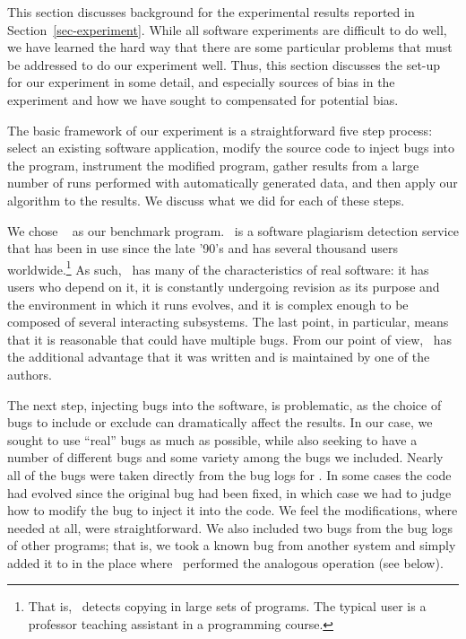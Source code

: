 This section discusses background for the experimental results
reported in Section~\ref{sec-experiment}.  While all software
experiments are difficult to do well, we have learned the hard way
that there are some particular problems that must be addressed to do
our experiment well.  Thus, this section discusses the set-up for our
experiment in some detail, and especially sources of bias in the
experiment and how we have sought to compensated for potential bias.

The basic framework of our experiment is a straightforward five step
process: select an existing software application, modify the source
code to inject bugs into the program, instrument the modified program,
gather results from a large number of runs performed with
automatically generated data, and then apply our algorithm to the
results.  We discuss what we did for each of these steps.

We chose \moss\ \cite{SWA03} as our benchmark program.  \moss\ is a
software plagiarism detection service that has been in use since the
late '90's and has several thousand users worldwide.\footnote{That is,
\moss\ detects copying in large sets of programs.  The typical \moss
user is a professor teaching assistant in a programming course.}  As
such, \moss\ has many of the characteristics of real software: it has
users who depend on it, it is constantly undergoing revision as its
purpose and the environment in which it runs evolves, and it is
complex enough to be composed of several interacting subsystems.  The
last point, in particular, means that it is reasonable that \moss
could have multiple bugs.  From our point of view, \moss\ has the
additional advantage that it was written and is maintained by one of
the authors.

The next step, injecting bugs into the software, is problematic, as
the choice of bugs to include or exclude can dramatically affect the
results.  In our case, we sought to use ``real'' bugs as much as
possible, while also seeking to have a number of different bugs and
some variety among the bugs we included.  Nearly all of the bugs were
taken directly from the bug logs for \moss.  In some cases the code
had evolved since the original bug had been fixed, in which case we
had to judge how to modify the bug to inject it into the code.  We
feel the modifications, where needed at all, were straightforward.  We
also included two bugs from the bug logs of other programs; that is,
we took a known bug from another system and simply added it to \moss
in the place where \moss\ performed the analogous operation (see
below).

